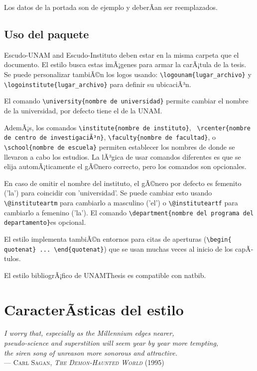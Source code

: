 \documentclass[11pt,spanish]{report}
\begin{document}
Los datos de la portada son de ejemplo y deberÃ­an ser reemplazados.

\section{Uso del paquete}
Escudo-UNAM and Escudo-Instituto deben estar en la misma carpeta que el documento. El estilo busca estas imÃ¡genes para armar la carÃ¡tula de la tesis. Se puede personalizar tambiÃ©n los logos usando: \texttt{\textbackslash{}logounam\{lugar\_archivo\}} y \texttt{\textbackslash{}logoinstitute\{lugar\_archivo\}} para definir su ubicaciÃ³n.

El comando \texttt{\textbackslash{}university\{nombre de universidad\}} permite cambiar el nombre de la universidad, por defecto tiene el de la UNAM.

AdemÃ¡s, los comandos \texttt{\textbackslash{}institute\{nombre de instituto\}}, \texttt{
\textbackslash{}rcenter\{nombre de centro de investigaciÃ³n\}},
\texttt{\textbackslash{}faculty\{nombre de facultad\}}, o
\texttt{\textbackslash{}school\{nombre de escuela\}} 
permiten establecer los nombres de donde se llevaron a cabo los estudios. La lÃ³gica de usar comandos diferentes es que se elija automÃ¡ticamente el gÃ©nero correcto, pero los comandos son opcionales.

En caso de omitir el nombre del instituto, el gÃ©nero por defecto es femenito ('la') para coincidir con 'universidad'.
Se puede cambiar esto usando \texttt{\textbackslash{}@instituteartm} para cambiarlo a masculino ('el') o \texttt{\textbackslash{}@instituteartf} para cambiarlo a femenino
('la'). El comando \texttt{\textbackslash{}department\{nombre del programa del departamento\}}es opcional.


El estilo implementa tambiÃ©n entornos para citas de aperturas
(\texttt{\textbackslash{}begin\{
quotenat\} ... \textbackslash{}end\{quotenat\}})
que se usan muchas veces al inicio de los capÃ­tulos.

El estilo bibliogrÃ¡fico de UNAMThesis es compatible con natbib.

\chapter{CaracterÃ­sticas del estilo}

\begin{quotenat}
\textsl{I worry that, especially as the Millennium edges nearer,\\
pseudo-science and superstition will seem year by year more tempting,\\
the siren song of unreason more sonorous and attractive.}\\
--- \textsc{Carl Sagan, \textit{The Demon-Haunted World} (1995)}
\end{quotenat}
\end{document}
